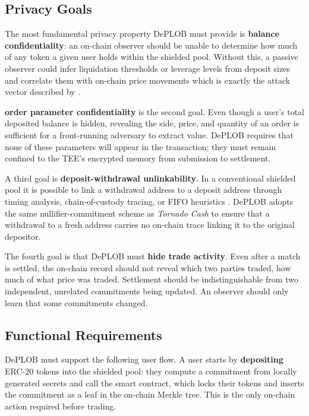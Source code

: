 \documentclass[12pt,a4paper]{article}
\begin{document}
\subsection{Privacy Goals}

The most fundamental privacy property DePLOB must provide is \textbf{balance confidentiality}: an on-chain observer should be unable to determine how much of any token a given user holds within the shielded pool. Without this, a passive observer could infer liquidation thresholds or leverage levels from deposit sizes and correlate them with on-chain price movements which is exactly the attack vector described by \textcite{daian2019flash}.

 \textbf{order parameter confidentiality} is the second goal. Even though a user's total deposited balance is hidden, revealing the side, price, and quantity of an order is sufficient for a front-running adversary to extract value. DePLOB requires that none of these parameters will appear in the transaction; they must remain confined to the TEE's encrypted memory from submission to settlement.

A third goal is \textbf{deposit-withdrawal unlinkability}. In a conventional shielded pool it is possible to link a withdrawal address to a deposit address through timing analysis, chain-of-custody tracing, or FIFO heuristics \parencite{tang2021analysis}. DePLOB adopts the same nullifier-commitment scheme as \textit{Tornado Cash} to ensure that a withdrawal to a fresh address carries no on-chain trace linking it to the original depositor.

The fourth goal is that DePLOB must \textbf{hide trade activity}. Even after a match is settled, the on-chain record should not reveal which two parties traded, how much of what price was traded. Settlement should be indistinguishable from two independent, unrelated commitments being updated. An observer should only learn that some commitments changed. 

\subsection{Functional Requirements}

DePLOB must support the following user flow. A user starts by \textbf{depositing} ERC-20 tokens into the shielded pool: they compute a commitment from locally generated secrets and call the smart contract, which locks their tokens and inserts the commitment as a leaf in the on-chain Merkle tree. This is the only on-chain action required before trading.
\end{document}
